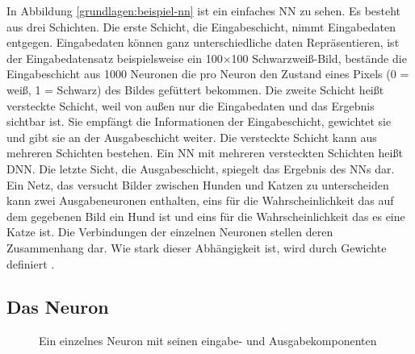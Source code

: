 In Abbildung \autoref{grundlagen:beispiel-nn} ist ein einfaches \acl{NN} zu sehen. Es besteht aus drei Schichten. Die erste Schicht, die Eingabeschicht, nimmt Eingabedaten entgegen. Eingabedaten können ganz unterschiedliche daten Repräsentieren, ist der Eingabedatensatz beispielsweise ein 100×100 Schwarzweiß-Bild, bestände die Eingabeschicht aus 1000 Neuronen die pro Neuron den Zustand eines Pixels (0 = weiß, 1 = Schwarz) des Bildes gefüttert bekommen. Die zweite Schicht heißt versteckte Schicht, weil von außen nur die Eingabedaten und das Ergebnis sichtbar ist. Sie empfängt die Informationen der Eingabeschicht, gewichtet sie und gibt sie an der Ausgabeschicht weiter. Die versteckte Schicht kann aus mehreren Schichten bestehen. Ein \ac{NN} mit mehreren versteckten Schichten heißt \ac{DNN}. Die letzte Sicht, die Ausgabeschicht, spiegelt das Ergebnis des \acp{NN} dar. Ein Netz, das versucht Bilder zwischen Hunden und Katzen zu unterscheiden kann zwei Ausgabeneuronen enthalten, eins für die Wahrscheinlichkeit das auf dem gegebenen Bild ein Hund ist und eins für die Wahrscheinlichkeit das es eine Katze ist. Die Verbindungen der einzelnen Neuronen stellen deren Zusammenhang dar. Wie stark dieser Abhängigkeit ist, wird durch Gewichte definiert \cite[S. 2--7]{krawczak2013multilayer}.


\subsection{Das Neuron}

\begin{figure}
  \centering
  \caption{Ein einzelnes Neuron mit seinen eingabe- und Ausgabekomponenten}

  \label{grundlagen:neuron}
\end{figure}

